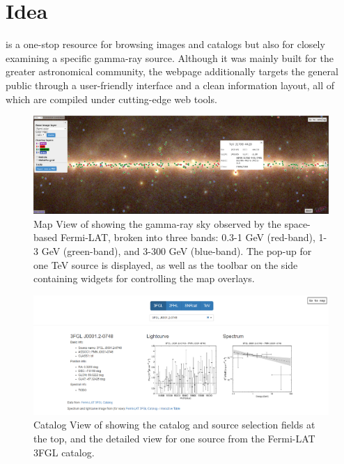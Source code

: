 \section{Idea}

\gammasky is a one-stop resource for browsing images and catalogs but also for closely examining a specific gamma-ray source. Although it was mainly built for the greater astronomical community, the webpage additionally targets the general public through a user-friendly interface and a clean information layout, all of which are compiled under cutting-edge web tools.

\begin{figure}[tb]
\centerline{\includegraphics[width=\textwidth]{figures/mapview_wide}}
\caption{Map View of \gammasky showing the gamma-ray sky observed by the space-based Fermi-LAT, broken into three bands: 0.3-1 GeV (red-band), 1-3 GeV (green-band), and 3-300 GeV (blue-band). The pop-up for one TeV source is displayed, as well as the toolbar on the side containing widgets for controlling the map overlays.}
\label{fig:mapview}
\end{figure}

\begin{figure}[tb]
\centerline{\includegraphics[width=\textwidth]{figures/catview_wide_zoom}}
\caption{Catalog View of \gammasky showing the catalog and source selection fields at the top, and the detailed view for one source from the Fermi-LAT 3FGL catalog.}
\label{fig:catview}
\end{figure}

